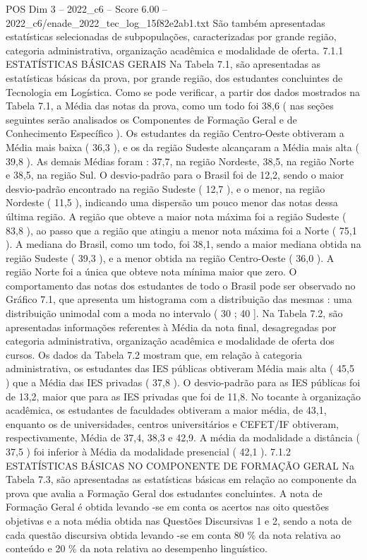 \begin{textsample}{POS Dim 3 – 2022\_c6 – Score 6.00 – 2022\_c6/enade\_2022\_tec\_log\_15f82e2ab1.txt}
São também apresentadas estatísticas selecionadas de subpopulações, caracterizadas por grande região, categoria administrativa, organização acadêmica e modalidade de oferta. 7.1.1 ESTATÍSTICAS BÁSICAS GERAIS Na Tabela 7.1, são apresentadas as estatísticas básicas da prova, por grande região, dos estudantes concluintes de Tecnologia em Logística.
Como se pode verificar, a partir dos dados mostrados na Tabela 7.1, a Média das notas da prova, como um todo foi 38,6 ( nas seções seguintes serão analisados os Componentes de Formação Geral e de Conhecimento Específico ).
Os estudantes da região Centro-Oeste obtiveram a Média mais baixa ( 36,3 ), e os da região Sudeste alcançaram a Média mais alta ( 39,8 ).
As demais Médias foram : 37,7, na região Nordeste, 38,5, na região Norte e 38,5, na região Sul.
O desvio-padrão para o Brasil foi de 12,2, sendo o maior desvio-padrão encontrado na região Sudeste ( 12,7 ), e o menor, na região Nordeste ( 11,5 ), indicando uma dispersão um pouco menor das notas dessa última região.
A região que obteve a maior nota máxima foi a região Sudeste ( 83,8 ), ao passo que a região que atingiu a menor nota máxima foi a Norte ( 75,1 ).
A mediana do Brasil, como um todo, foi 38,1, sendo a maior mediana obtida na região Sudeste ( 39,3 ), e a menor obtida na região Centro-Oeste ( 36,0 ).
A região Norte foi a única que obteve nota mínima maior que zero.
O comportamento das notas dos estudantes de todo o Brasil pode ser observado no Gráfico 7.1, que apresenta um histograma com a distribuição das mesmas : uma distribuição unimodal com a moda no intervalo ( 30 ; 40 ].
Na Tabela 7.2, são apresentadas informações referentes à Média da nota final, desagregadas por categoria administrativa, organização acadêmica e modalidade de oferta dos cursos.
Os dados da Tabela 7.2 mostram que, em relação à categoria administrativa, os estudantes das IES públicas obtiveram Média mais alta ( 45,5 ) que a Média das IES privadas ( 37,8 ).
O desvio-padrão para as IES públicas foi de 13,2, maior que para as IES privadas que foi de 11,8.
No tocante à organização acadêmica, os estudantes de faculdades obtiveram a maior média, de 43,1, enquanto os de universidades, centros universitários e CEFET/IF obtiveram, respectivamente, Média de 37,4, 38,3 e 42,9.
A média da modalidade a distância ( 37,5 ) foi inferior à Média da modalidade presencial ( 42,1 ). 7.1.2 ESTATÍSTICAS BÁSICAS NO COMPONENTE DE FORMAÇÃO GERAL Na Tabela 7.3, são apresentadas as estatísticas básicas em relação ao componente da prova que avalia a Formação Geral dos estudantes concluintes.
A nota de Formação Geral é obtida levando -se em conta os acertos nas oito questões objetivas e a nota média obtida nas Questões Discursivas 1 e 2, sendo a nota de cada questão discursiva obtida levando -se em conta 80 \% da nota relativa ao conteúdo e 20 \% da nota relativa ao desempenho linguístico.

\end{textsample}
